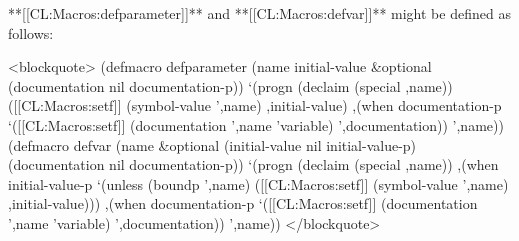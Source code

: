 **[[CL:Macros:defparameter]]** and **[[CL:Macros:defvar]]** might be defined as follows:

<blockquote> (defmacro defparameter (name initial-value &optional (documentation nil documentation-p)) `(progn (declaim (special ,name)) ([[CL:Macros:setf]] (symbol-value ',name) ,initial-value) ,(when documentation-p `([[CL:Macros:setf]] (documentation ',name 'variable) ',documentation)) ',name)) (defmacro defvar (name &optional (initial-value nil initial-value-p) (documentation nil documentation-p)) `(progn (declaim (special ,name)) ,(when initial-value-p `(unless (boundp ',name) ([[CL:Macros:setf]] (symbol-value ',name) ,initial-value))) ,(when documentation-p `([[CL:Macros:setf]] (documentation ',name 'variable) ',documentation)) ',name)) </blockquote>

    
